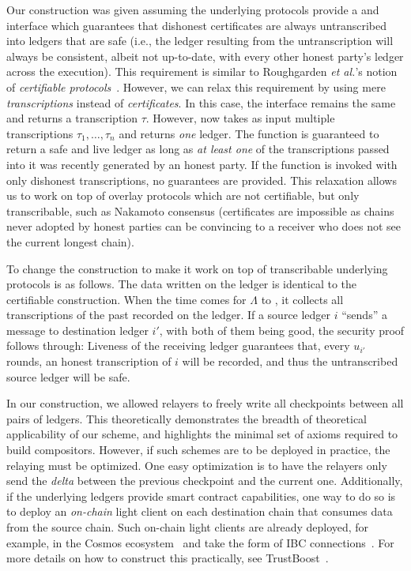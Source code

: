 Our \rollerblade construction was given assuming the underlying protocols
provide a \transcribe and \untranscribe interface which guarantees that
dishonest certificates are always untranscribed into ledgers that are
safe (i.e., the ledger resulting from the untranscription will always
be consistent, albeit not up-to-date, with every other honest party's
ledger across the execution). This requirement is similar to Roughgarden
\emph{et al.}'s notion of \emph{certifiable protocols}~\cite{certifiable-roughgarden}.
However, we can relax this requirement by using mere \emph{transcriptions}
instead of \emph{certificates}. In this case, the \transcribe interface
remains the same and returns a transcription $\tau$. However, \untranscribe
now takes as input multiple transcriptions $\tau_1, \ldots, \tau_n$ and
returns \emph{one} ledger. The \untranscribe function is guaranteed to return
a safe and live ledger as long as \emph{at least one} of the transcriptions
passed into it was recently generated by an honest party. If the \untranscribe
function is invoked with only dishonest transcriptions, no guarantees are
provided. This relaxation allows us to work on top of overlay protocols
which are not certifiable, but only transcribable, such as Nakamoto consensus
(certificates are impossible as chains never adopted by honest parties
can be convincing to a receiver who does not see the current longest chain).

To change the \rollerblade construction to make it work on top of transcribable
underlying protocols is as follows. The data written on the ledger is identical to the
certifiable \rollerblade construction. When the time comes for $\Lambda$ to
\untranscribe, it collects all transcriptions of the past recorded on the ledger.
If a source ledger $i$ ``sends'' a message to destination ledger $i'$, with both
of them being good, the security proof follows through:
Liveness of the receiving ledger guarantees that, every $u_{i'}$ rounds, an honest
transcription of $i$ will be recorded, and thus the untranscribed source ledger
will be safe.

In our \rollerblade construction, we allowed relayers to freely write all
checkpoints between all pairs of ledgers. This theoretically demonstrates
the breadth of theoretical applicability of our scheme, and highlights
the minimal set of axioms required to build compositors.
However, if such schemes are to be deployed in practice, the relaying
must be optimized. One easy optimization is to have the relayers only
send the \emph{delta} between the previous checkpoint and the current one.
Additionally, if the underlying ledgers provide smart contract
capabilities, one way to do so is to deploy an \emph{on-chain} light
client on each destination chain that consumes data from the source
chain. Such on-chain light clients are already deployed, for example,
in the Cosmos ecosystem~\cite{cosmos} and take the form of IBC
connections~\cite{ibc}. For more details on how to construct this
practically, see TrustBoost~\cite{trustboost}.